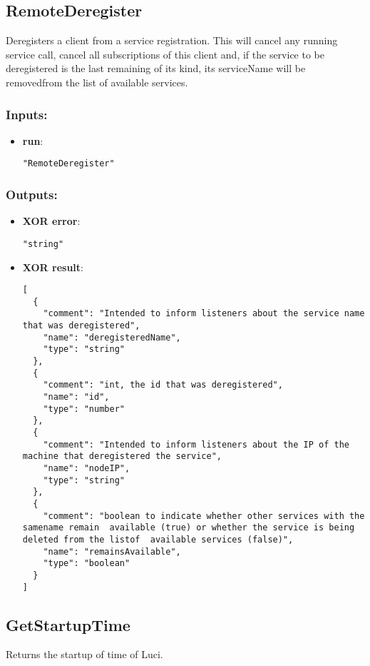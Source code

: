 \subsection{RemoteDeregister}
Deregisters
 a client from a service registration. This will cancel any running 
service call, cancel all subscriptions of this client and, if the 
service to be deregistered is the last remaining of its kind, its 
serviceName will be removedfrom the list of available services.
\subsubsection*{Inputs:}
\begin{itemize}
    \item \textbf{run}: 
\begin{lstlisting}
"RemoteDeregister"
\end{lstlisting}
  \end{itemize}

\subsubsection*{Outputs:}
\begin{itemize}
    \item \textbf{XOR error}: 
\begin{lstlisting}
"string"
\end{lstlisting}
    \item \textbf{XOR result}: 
\begin{lstlisting}
[
  {
    "comment": "Intended to inform listeners about the service name that was deregistered", 
    "name": "deregisteredName", 
    "type": "string"
  }, 
  {
    "comment": "int, the id that was deregistered", 
    "name": "id", 
    "type": "number"
  }, 
  {
    "comment": "Intended to inform listeners about the IP of the machine that deregistered the service", 
    "name": "nodeIP", 
    "type": "string"
  }, 
  {
    "comment": "boolean to indicate whether other services with the samename remain  available (true) or whether the service is being deleted from the listof  available services (false)", 
    "name": "remainsAvailable", 
    "type": "boolean"
  }
]
\end{lstlisting}
  \end{itemize}

\subsection{GetStartupTime}
Returns the startup of time of Luci.
